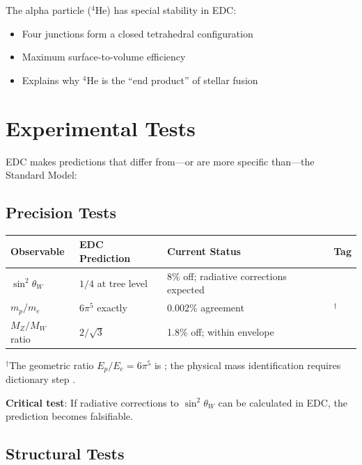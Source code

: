 The alpha particle ($^4$He) has special stability in EDC:
\begin{itemize}[nosep]
\item Four junctions form a closed tetrahedral configuration
\item Maximum surface-to-volume efficiency
\item Explains why $^4$He is the ``end product'' of stellar fusion
\end{itemize}

\section{Experimental Tests}

EDC makes predictions that differ from---or are more specific than---the
Standard Model:

\subsection{Precision Tests}

\begin{center}
\begin{tabular}{llll}
\toprule
\textbf{Observable} & \textbf{EDC Prediction} & \textbf{Current Status} & \textbf{Tag} \\
\midrule
$\sin^2\theta_W$ & $1/4$ at tree level & 8\% off; radiative corrections expected & \tagDc{} \\
$m_p/m_e$ & $6\pi^5$ exactly & 0.002\% agreement & \tagDc{}$^\dagger$ \\
$M_Z/M_W$ ratio & $2/\sqrt{3}$ & 1.8\% off; within envelope & \tagDcApprox{} \\
\bottomrule
\end{tabular}
\end{center}

$^\dagger$The geometric ratio $E_p/E_e = 6\pi^5$ is \tagDerSym{}; the physical
mass identification requires dictionary step \tagDc{}.

\textbf{Critical test}: If radiative corrections to $\sin^2\theta_W$ can be
calculated in EDC, the prediction becomes falsifiable.

\subsection{Structural Tests}


